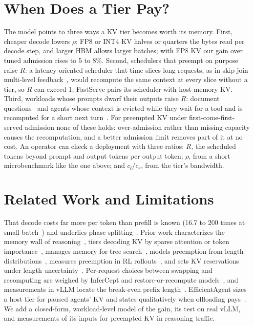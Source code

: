 \documentclass[journal]{IEEEtran}
\begin{document}
\section{When Does a Tier Pay?}
\label{sec:pays}
The model points to three ways a KV tier becomes worth its memory. First, cheaper decode lowers
$\rho$: FP8 or INT4 KV halves or quarters the bytes read per decode step, and larger HBM allows larger
batches; with FP8 KV our gain over tuned admission rises to 5 to 8\%. Second, schedulers that preempt on purpose raise $R$:
a latency-oriented scheduler that time-slices long requests, as in skip-join multi-level
feedback~\cite{fastserve}, would recompute the same context at every slice without a tier, so $R$ can
exceed 1; FastServe pairs its scheduler with host-memory KV. Third, workloads whose prompts dwarf
their outputs raise $R$: document questions~\cite{samsung_cmmd} and agents whose context is evicted
while they wait for a tool and is recomputed for a short next turn~\cite{efficientagent,unison}. For
preempted KV under first-come-first-served admission none of these holds: over-admission rather
than missing capacity causes the recomputation, and a better admission limit removes part of it at
no cost. An operator can check a deployment with three ratios: $R$, the scheduled tokens beyond
prompt and output tokens per output token; $\rho$, from a short microbenchmark like the one above;
and $c_l/c_r$, from the tier's bandwidth.

\section{Related Work and Limitations}
That decode costs far more per token than prefill is known (16.7 to 200 times at small
batch~\cite{sarathi}) and underlies phase splitting~\cite{splitwise,distserve}. Prior work
characterizes the memory wall of reasoning~\cite{kinetics,infscaling}, tiers decoding KV
by sparse attention or token importance~\cite{oasiskv,notallthoughts}, manages memory for tree
search~\cite{fasttts}, models preemption from length distributions~\cite{congestion}, measures
preemption in RL rollouts~\cite{rollpacker}, and sets KV reservations under length
uncertainty~\cite{robustkv}. Per-request choices between swapping and recomputing are weighed by
InferCept and restore-or-recompute models~\cite{infercept,restore_recompute}, and measurements in
vLLM locate the break-even prefix length~\cite{pykvcache}. EfficientAgent sizes a host tier for
paused agents' KV and states qualitatively when offloading pays~\cite{efficientagent}. We add a
closed-form, workload-level model of the gain, its test on real vLLM, and measurements of its inputs
for preempted KV in reasoning traffic.
\end{document}
